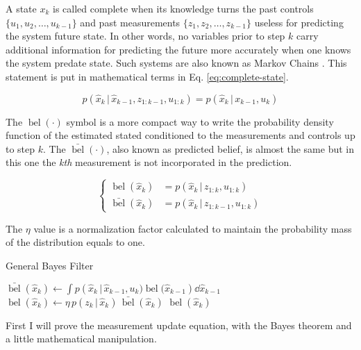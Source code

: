 \documentclass[12pt]{article}
\newcommand{\bel}{\mathop{bel}} %
\newcommand{\parentheses}[1]{\left(#1\right)}
\newcommand{\belF}[1]{\mathop{bel}\parentheses{#1}} %
\newcommand{\pr}[1]{p\parentheses{#1}}
\begin{document}
A state $x_k$ is called complete when its knowledge turns the past controls $\{u_1, u_2, \dots, u_{k-1}\}$ and past measurements $\{z_1, z_2, \dots, z_{k-1}\}$ useless for predicting the system future state. In other words, no variables prior to step $k$ carry additional information for predicting the future more accurately when one knows the system predate state. Such systems are also known as Markov Chains \cite[p.~21]{bongard2006probabilistic}. This statement is put in mathematical terms in Eq. \ref{eq:complete-state}.

\begin{equation}
p(\hat{x}_k \,|\, \hat{x}_{k-1}, z_{1:k-1}, u_{1:k}) = p(\hat{x}_k \,|\, x_{k-1}, u_k)
\label{eq:complete-state}
\end{equation}

The $\belF{\cdot}$ symbol is a more compact way to write the probability density function of the estimated stated conditioned to the measurements and controls up to step $k$. The $\bar{\bel}(\cdot)$, also known as predicted belief, is almost the same but in this one the \textit{kth} measurement is not incorporated in the prediction.

\begin{equation}
\begin{cases}
    \bel(\hat{x}_k) &= \pr{\hat{x}_k \,|\, z_{1:k}, u_{1:k}}\\
    \bar{\bel}(\hat{x}_k) &= \pr{\hat{x}_k \,|\, z_{1:k-1}, u_{1:k}}
\end{cases}
\label{eq:belief}
\end{equation}

The $\eta$ value is a normalization factor calculated to maintain the probability mass of the distribution equals to one.

\begin{algorithm}[h]
\caption{General Bayes Filter}
\label{alg:general-bayes-filter}
\begin{algorithmic}[1]
\Procedure{Bayes Filter}{$\bel(\hat{x}_{k-1}), u_k, z_k$}
\State $\bar{\bel}(\hat{x}_k) \gets \int{\pr{\hat{x}_k \,|\, \hat{x}_{k-1}, u_k) \bel(\hat{x}_{k-1}} } \dd{\hat{x}_{k-1}}$ 
\State $\bel(\hat{x}_k) \gets \eta \, p(z_k \,|\, \hat{x}_k) \,\bar{\bel}(\hat{x}_k)$ 
\State \Return $\bel(\hat{x}_k)$
\EndProcedure
\end{algorithmic}
\end{algorithm}

First I will prove the measurement update equation, with the Bayes theorem and a little mathematical manipulation.
\end{document}
